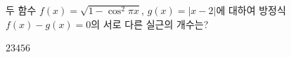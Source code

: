 두 함수 $f(x)=\sqrt{1-\cos^2\pi x}$, $g(x)=|x-2|$에 대하여 방정식 $f(x)-g(x)=0$의 서로 다른 실근의 개수는?
\begin{choices32}{$2$}{$3$}{$4$}{$5$}{$6$}\end{choices32}
